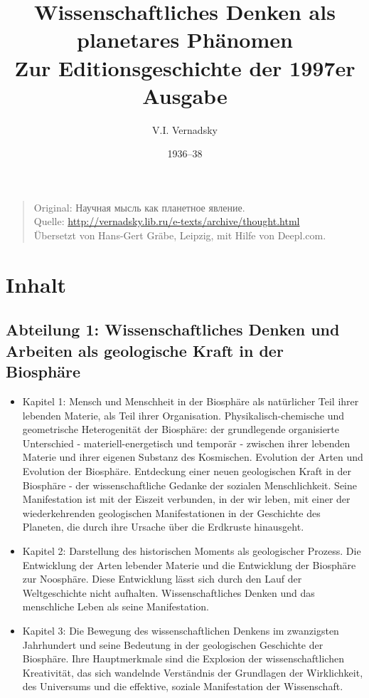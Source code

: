 \documentclass[11pt,a4paper]{article}
\title{Wissenschaftliches Denken als planetares Phänomen\\ Zur
  Editionsgeschichte der 1997er Ausgabe}
\author{V.I. Vernadsky}
\date{1936--38}
\begin{document}
\maketitle
\begin{quote}
  Original: \foreignlanguage{russian}{Научная мысль как планетное явление}.\\
  Quelle: \url{http://vernadsky.lib.ru/e-texts/archive/thought.html}\\
  Übersetzt von Hans-Gert Gräbe, Leipzig, mit Hilfe von Deepl.com.
\end{quote}

\section{Inhalt} 

\subsection{Abteilung 1: Wissenschaftliches Denken und Arbeiten als
  geologische Kraft in der Biosphäre}
\begin{itemize}
\item Kapitel 1: Mensch und Menschheit in der Biosphäre als natürlicher Teil
  ihrer lebenden Materie, als Teil ihrer Organisation. Physikalisch-chemische
  und geometrische Heterogenität der Biosphäre: der grundlegende organisierte
  Unterschied - materiell-energetisch und temporär - zwischen ihrer lebenden
  Materie und ihrer eigenen Substanz des Kosmischen. Evolution der Arten und
  Evolution der Biosphäre. Entdeckung einer neuen geologischen Kraft in der
  Biosphäre - der wissenschaftliche Gedanke der sozialen Menschlichkeit. Seine
  Manifestation ist mit der Eiszeit verbunden, in der wir leben, mit einer der
  wiederkehrenden geologischen Manifestationen in der Geschichte des Planeten,
  die durch ihre Ursache über die Erdkruste hinausgeht.

\item Kapitel 2: Darstellung des historischen Moments als geologischer
  Prozess. Die Entwicklung der Arten lebender Materie und die Entwicklung der
  Biosphäre zur Noosphäre. Diese Entwicklung lässt sich durch den Lauf der
  Weltgeschichte nicht aufhalten. Wissenschaftliches Denken und das
  menschliche Leben als seine Manifestation.

\item Kapitel 3: Die Bewegung des wissenschaftlichen Denkens im zwanzigsten
  Jahrhundert und seine Bedeutung in der geologischen Geschichte der
  Biosphäre. Ihre Hauptmerkmale sind die Explosion der wissenschaftlichen
  Kreativität, das sich wandelnde Verständnis der Grundlagen der Wirklichkeit,
  des Universums und die effektive, soziale Manifestation der Wissenschaft.
\end{itemize}
\end{document}
